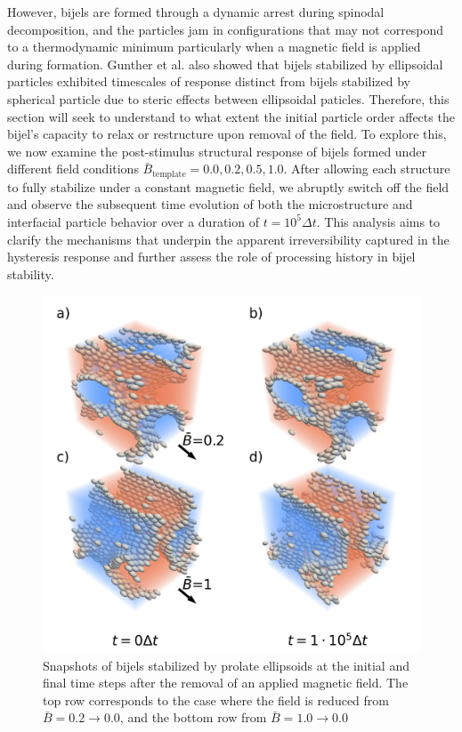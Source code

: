 However, bijels are formed through a dynamic arrest during spinodal decomposition, and the 
particles jam in configurations that may not correspond to a thermodynamic minimum particularly when a magnetic field is 
applied during formation. Gunther et al. also showed that bijels stabilized by ellipsoidal particles exhibited timescales 
of response distinct from bijels stabilized by spherical particle due to steric effects between ellipsoidal paticles.
Therefore, this section will seek to understand to what extent the initial particle order affects the 
bijel's capacity to relax or restructure upon removal of the field. To explore this, 
we now examine the post-stimulus structural response of bijels formed under different field conditions 
\(\bar{B}_{\text{template}} = 0.0, 0.2, 0.5, 1.0\). After allowing each structure to fully stabilize under a 
constant magnetic field, we abruptly switch off the field and observe the subsequent time evolution of both the 
microstructure and interfacial particle behavior over a duration of \(t = 10^5 \Delta t\). This analysis aims to 
clarify the mechanisms that underpin the apparent irreversibility captured in the hysteresis response and further 
assess the role of processing history in bijel stability.

\begin{figure} 
\centering 
\includegraphics[scale=0.4]{../figures/results/paper2/microstructure_viz-field_down.png} 
\caption{Snapshots of bijels stabilized by prolate ellipsoids at 
         the initial and final time steps after the removal of an applied magnetic field. The top row corresponds to the case where 
         the field is reduced from \(\bar{B} = 0.2 \rightarrow 0.0\), and the bottom row from \(\bar{B} = 1.0 \rightarrow 0.0\)}
\label{fig:microstructure_viz-field_down}
\end{figure}

